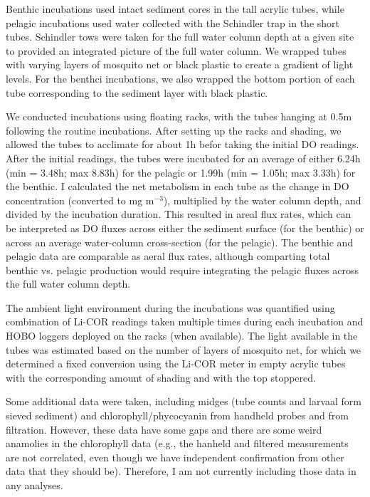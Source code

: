 \documentclass[12pt]{article}
\begin{document}
Benthic incubations used intact sediment cores in the tall acrylic tubes,
while pelagic incubations used water collected with the Schindler trap in the short tubes.
Schindler tows were taken for the full water column depth at a given site
to provided an integrated picture of the full water column.
We wrapped tubes with varying layers of mosquito net or black plastic 
to create a gradient of light levels. 
For the benthci incubations, we also wrapped the bottom portion of each tube 
corresponding to the sediment layer with black plastic.

We conducted incubations using floating racks, with the tubes hanging at 0.5m 
following the routine incubations.
After setting up the racks and shading, we allowed the tubes to acclimate for about 1h
befor taking the initial DO readings. 
After the initial readings, the tubes were incubated
for an average of either 6.24h (min = 3.48h; max 8.83h) for the pelagic
or 1.99h (min = 1.05h; max 3.33h) for the benthic.
I calculated the net metabolism in each tube as the change in DO concentration 
(converted to mg $\text{m}^{-3}$), multiplied by the water column depth, 
and divided by the incubation duration.
This resulted in areal flux rates, 
which can be interpreted as DO fluxes across either the sediment surface (for the benthic)
or across an average water-column cross-section (for the pelagic). 
The benthic and pelagic data are comparable as aeral flux rates, 
although comparting total benthic vs. pelagic production would require
integrating the pelagic fluxes across the full water column depth.

The ambient light environment during the incubations was quantified 
using combination of Li-COR readings taken multiple times during each incubation
and HOBO loggers deployed on the racks (when available).
The light available in the tubes was estimated based on the number of layers of mosquito net,
for which we determined a fixed conversion using the Li-COR meter in empty acrylic tubes
with the corresponding amount of shading and with the top stoppered.

Some additional data were taken, 
including midges (tube counts and larvaal form sieved sediment) 
and chlorophyll/phycocyanin from handheld probes and from filtration. 
However, these data have some gaps and there are some weird anamolies in the chlorophyll data
(e.g., the hanheld and filtered measurements are not correlated, 
even though we have independent confirmation from other data that they should be).
Therefore, I am not currently including those data in any analyses.
\end{document}
